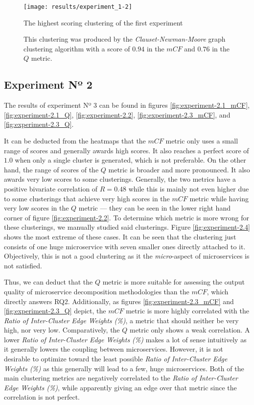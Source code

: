 \documentclass[12pt,a4paper]{report}
\begin{document}
\begin{figure}[htbp]
\centering
\texttt{[image: results/experiment\_1-2]}
\caption{The highest scoring clustering of the first experiment}
\caption*{\centering
  This clustering was produced by the \textit{Clauset-Newman-Moore} graph clustering algorithm with a score of $0.94$ in the $mCF$ and $0.76$ in the $Q$ metric.
}
\label{fig:experiment-1.2}
\end{figure}


\subsection{Experiment Nº 2}

The results of experiment Nº 3 can be found in figures \ref{fig:experiment-2.1_mCF},
\ref{fig:experiment-2.1_Q}, \ref{fig:experiment-2.2}, \ref{fig:experiment-2.3_mCF},
and \ref{fig:experiment-2.3_Q}.

It can be deducted from the heatmaps that the $mCF$ metric
only uses a small range of scores and generally awards high scores.
It also reaches a perfect score of $1.0$ when only a single cluster is generated,
which is not preferable.
On the other hand, the range of scores of the $Q$ metric is broader and more pronounced.
It also awards very low scores to some clusterings.
Generally, the two metrics have a positive bivariate correlation of \(R = 0.48\) while
this is mainly not even higher due to some clusterings that achieve very high scores
in the $mCF$ metric while having very low scores in the $Q$ metric --- they can be
seen in the lower right hand corner of figure \ref{fig:experiment-2.2}.
To determine which metric is more wrong for these clusterings, we manually studied
said clusterings. Figure \ref{fig:experiment-2.4} shows the most extreme of these cases.
It can be seen that the clustering just consists of one huge microservice with seven
smaller ones directly attached to it. Objectively, this is not a good clustering
as it the \textit{micro}\hyp aspect of microservices is not satisfied.

Thus, we can deduct that the $Q$ metric is more suitable for assessing the output
quality of microservice decomposition methodologies than the $mCF$, which directly answers RQ2.
Additionally, as figures \ref{fig:experiment-2.3_mCF} and \ref{fig:experiment-2.3_Q}
depict, the $mCF$ metric is more highly correlated with the
\textit{Ratio of Inter-Cluster Edge Weights (\%)}, a metric that should neither
be very high, nor very low. Comparatively, the $Q$ metric only shows a weak correlation.
A lower \textit{Ratio of Inter-Cluster Edge Weights (\%)} makes a lot of sense
intuitively as it generally lowers the coupling between microservices.
However, it is not desirable to optimize toward the least possible
\textit{Ratio of Inter-Cluster Edge Weights (\%)}
as this generally will lead to a few, huge microservices.
Both of the main clustering metrics are negatively correlated to the
\textit{Ratio of Inter-Cluster Edge Weights (\%)}, while apparently
giving an edge over that metric since the correlation is not perfect.
\end{document}
